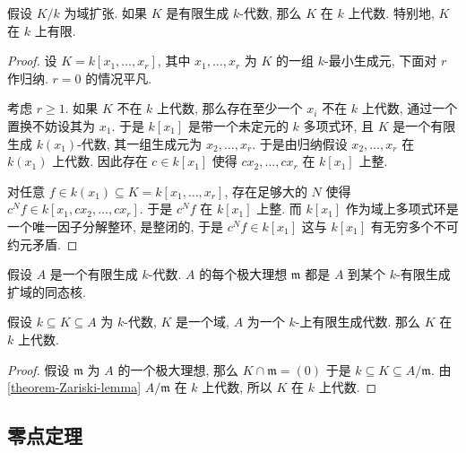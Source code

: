 \begin{theorem}[Zariski 引理]
  \label{theorem-Zariski-lemma}
  假设 \( K/k \) 为域扩张.
  如果 \( K \) 是有限生成 \( k \)-代数, 那么 \( K \) 在 \( k \) 上代数.
  特别地, \( K \) 在 \( k \) 上有限.
\end{theorem}
\begin{proof}
  设 \( K = k[x_1, \ldots, x_r] \), 其中 \( x_1, \ldots, x_r \) 为 \( K \)
  的一组 \( k \)-最小生成元, 下面对 \( r \) 作归纳.
  \( r = 0 \) 的情况平凡.

  考虑 \( r \geq 1 \).
  如果 \( K \) 不在 \( k \) 上代数, 那么存在至少一个 \( x_i \) 不在 \( k \)
  上代数, 通过一个置换不妨设其为 \( x_1 \).
  于是 \( k[x_1] \) 是带一个未定元的 \( k \) 多项式环, 且 \( K \) 是一个有限生成
  \( k(x_1) \)-代数, 其一组生成元为 \( x_2, \ldots, x_r \).
  于是由归纳假设 \( x_2, \ldots, x_r \) 在 \( k(x_1) \) 上代数.
  因此存在 \( c \in k[x_1] \) 使得 \( cx_2, \ldots, cx_r \) 在 \( k[x_1] \)
  上整.

  对任意 \( f \in k(x_1) \subseteq K = k[x_1, \ldots, x_r] \), 存在足够大的 \( N
  \) 使得 \( c^N f \in k[x_1, cx_2, \ldots, cx_r] \).
  于是 \( c^N f \) 在 \( k[x_1] \) 上整.
  而 \( k[x_1] \) 作为域上多项式环是一个唯一因子分解整环, 是整闭的, 于是 \( c^N
  f \in k[x_1] \) 这与 \( k[x_1] \) 有无穷多个不可约元矛盾.
\end{proof}

\begin{corollary}
  假设 \( A \) 是一个有限生成 \( k \)-代数.
  \( A \) 的每个极大理想 \( \mathfrak{m} \) 都是 \( A \) 到某个 \( k
  \)-有限生成扩域的同态核.
\end{corollary}

\begin{corollary}
  假设 \( k \subseteq K \subseteq A \) 为 \( k \)-代数, \( K \) 是一个域, \( A
  \) 为一个 \( k \)-上有限生成代数.
  那么 \( K \) 在 \( k \) 上代数.
\end{corollary}
\begin{proof}
  假设 \( \mathfrak{m} \) 为 \( A \) 的一个极大理想, 那么 \( K \cap \mathfrak{m}
  = (0) \) 于是 \( k \subseteq K \subseteq A/\mathfrak{m} \).
  由\cref{theorem-Zariski-lemma} \( A/\mathfrak{m} \) 在 \( k \) 上代数, 所以 \(
  K \) 在 \( k \) 上代数.
\end{proof}

\subsection{零点定理}

